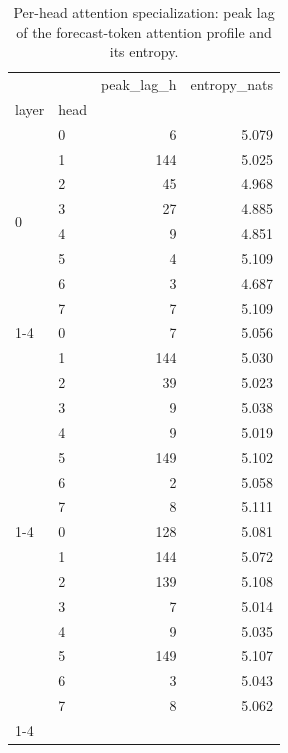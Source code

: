 \begin{table}
\caption{Per-head attention specialization: peak lag of the forecast-token attention profile and its entropy.}
\label{tab:heads}
\begin{tabular}{llrr}
\toprule
 &  & peak\_lag\_h & entropy\_nats \\
layer & head &  &  \\
\midrule
\multirow[t]{8}{*}{0} & 0 & 6 & 5.079 \\
 & 1 & 144 & 5.025 \\
 & 2 & 45 & 4.968 \\
 & 3 & 27 & 4.885 \\
 & 4 & 9 & 4.851 \\
 & 5 & 4 & 5.109 \\
 & 6 & 3 & 4.687 \\
 & 7 & 7 & 5.109 \\
\cline{1-4}
\multirow[t]{8}{*}{1} & 0 & 7 & 5.056 \\
 & 1 & 144 & 5.030 \\
 & 2 & 39 & 5.023 \\
 & 3 & 9 & 5.038 \\
 & 4 & 9 & 5.019 \\
 & 5 & 149 & 5.102 \\
 & 6 & 2 & 5.058 \\
 & 7 & 8 & 5.111 \\
\cline{1-4}
\multirow[t]{8}{*}{2} & 0 & 128 & 5.081 \\
 & 1 & 144 & 5.072 \\
 & 2 & 139 & 5.108 \\
 & 3 & 7 & 5.014 \\
 & 4 & 9 & 5.035 \\
 & 5 & 149 & 5.107 \\
 & 6 & 3 & 5.043 \\
 & 7 & 8 & 5.062 \\
\cline{1-4}
\bottomrule
\end{tabular}
\end{table}
